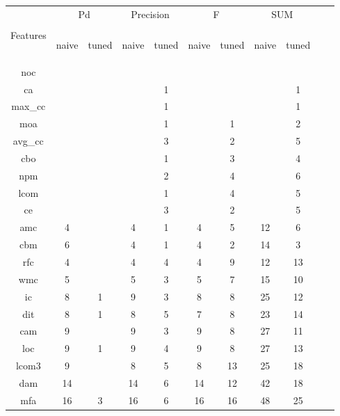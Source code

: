 \documentclass{sig-alternative}
\def\baselinestretch{1}
\begin{document}
\begin{figure}[!ht]

\renewcommand{\baselinestretch}{0.8}
\scriptsize
\centering
  \begin{tabular}{c|c c|c c|c c|c c| c c }
  
    & \multicolumn{2}{c|}{Pd} &  \multicolumn{2}{c|}{Precision} & \multicolumn{2}{c|}{F} &  \multicolumn{2}{c|}{SUM}\\
 &&&&&&&&\\
Features& \begin{sideways}naive\end{sideways}
& \begin{sideways}tuned\end{sideways}
& \begin{sideways}naive\end{sideways}
& \begin{sideways}tuned\end{sideways}
& \begin{sideways}naive\end{sideways}
& \begin{sideways}tuned\end{sideways}
& \begin{sideways}naive\end{sideways}
& \begin{sideways}tuned\end{sideways}
\\\hline
noc&	&	&	&	&	&	&	&	&	\\
ca&	&	&	&	1&	&	&	&	1&	\\
max\_cc&	&	&	&	1&	&	&	&	1&	\\
moa&	&	&	&	1&	&	1&	&	2&	\\
avg\_cc&	&	&	&	3&	&	2&	&	5&	\\
cbo&	&	&	&	1&	&	3&	&	4&	\\
npm&	&	&	&	2&	&	4&	&	6&	\\
lcom&	&	&	&	1&	&	4&	&	5&	\\
ce&	&	&	&	3&	&	2&	&	5&	\\
amc&	4&	&	4&	1&	4&	5&	12&	6&	\\
cbm&	6&	&	4&	1&	4&	2&	14&	3&	\\
rfc&	4&	&	4&	4&	4&	9&	12&	13&	\\
wmc&	5&	&	5&	3&	5&	7&	15&	10&	\\
ic&	8&	1&	9&	3&	8&	8&	25&	12&	\\
dit&	8&	1&	8&	5&	7&	8&	23&	14&	\\
cam&	9&	&	9&	3&	9&	8&	27&	11&	\\
loc&	9&	1&	9&	4&	9&	8&	27&	13&	\\
lcom3&	9&	&	8&	5&	8&	13&	25&	18&	\\
dam&	14&	&	14&	6&	14&	12&	42&	18&	\\
mfa&	16&	3&	16&	6&	16&	16&	48&	25&	\\


\end{tabular}
\end{figure}
\end{document}
